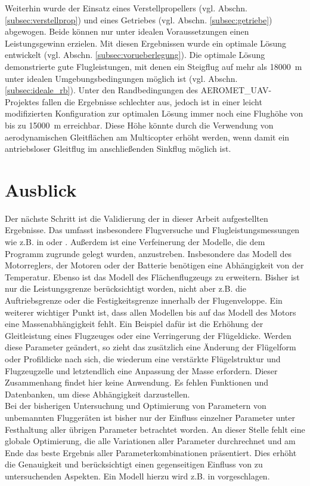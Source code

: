 Weiterhin wurde der Einsatz eines Verstellpropellers (vgl. Abschn. \ref{subsec:verstellprop}) und eines Getriebes (vgl. Abschn. \ref{subsec:getriebe}) abgewogen. Beide können nur unter idealen Voraussetzungen einen Leistungsgewinn erzielen.
Mit diesen Ergebnissen wurde ein optimale Lösung entwickelt (vgl. Abschn. \ref{subsec:vorueberlegung}). Die optimale Lösung demonstrierte gute Flugleistungen, mit denen ein Steigflug auf mehr als \SI{18000}{m} unter idealen Umgebungsbedingungen möglich ist (vgl. Abschn. \ref{subsec:ideale_rb}). Unter den Randbedingungen des AEROMET\_UAV-Projektes fallen die Ergebnisse schlechter aus, jedoch ist in einer leicht modifizierten Konfiguration zur optimalen Lösung immer noch eine Flughöhe von bis zu \SI{15000}{m} erreichbar. Diese Höhe könnte durch die Verwendung von aerodynamischen Gleitflächen am Multicopter erhöht werden, wenn damit ein antriebsloser Gleitflug im anschließenden Sinkflug möglich ist.


\section{Ausblick}
Der nächste Schritt ist die Validierung der in dieser Arbeit aufgestellten Ergebnisse. Das umfasst insbesondere Flugversuche und Flugleistungsmessungen wie z.B. in \cite{Ostler.2006} oder \cite{PCUP.2017}.
Außerdem ist eine Verfeinerung der Modelle, die dem Programm zugrunde gelegt wurden, anzustreben. Insbesondere das Modell des Motorreglers, der Motoren oder der Batterie benötigen eine Abhängigkeit von der Temperatur.
Ebenso ist das Modell des Flächenflugzeugs zu erweitern. Bisher ist nur die Leistungsgrenze berücksichtigt worden, nicht aber z.B. die Auftriebsgrenze oder die Festigkeitsgrenze innerhalb der Flugenveloppe. 
Ein weiterer wichtiger Punkt ist, dass allen Modellen bis auf das Modell des Motors eine Massenabhängigkeit fehlt. Ein Beispiel dafür ist die Erhöhung der Gleitleistung eines Flugzeuges oder eine Verringerung der Flügeldicke. Werden diese Parameter geändert, so zieht das zusätzlich eine Änderung der Flügelform oder Profildicke nach sich, die wiederum eine verstärkte Flügelstruktur und Flugzeugzelle und letztendlich eine Anpassung der Masse erfordern. Dieser Zusammenhang findet hier keine Anwendung. Es fehlen Funktionen und Datenbanken, um diese Abhängigkeit darzustellen.\\
Bei der bisherigen Untersuchung und Optimierung von Parametern von unbemannten Fluggeräten ist bisher nur der Einfluss einzelner Parameter unter Festhaltung aller übrigen Parameter betrachtet worden. An dieser Stelle fehlt eine globale Optimierung, die alle Variationen aller Parameter durchrechnet und am Ende das beste Ergebnis aller Parameterkombinationen präsentiert. Dies erhöht die Genauigkeit und berücksichtigt einen gegenseitigen Einfluss von zu untersuchenden Aspekten. Ein Modell hierzu wird z.B. in \cite{Magnussen.2015} vorgeschlagen. 
